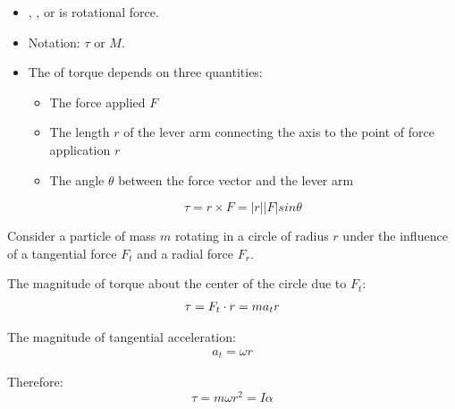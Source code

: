             \begin{itemize}
                \item {}, , or  is
                rotational force.
                \item Notation: $\tau$ or $M$.
                \item The  of torque depends on three quantities:
                    \begin{itemize}
                        \item The force applied $F$
                        \item The length $r$ of the lever arm connecting the axis to
                            the point of force application $r$
                        \item The angle $\theta$ between the force vector and the lever arm
                    \end{itemize}
                \begin{equation}
                    \tau = r \times F = |r||F|sin \theta
                \end{equation}
            \end{itemize}

            \par Consider a particle of mass $m$ rotating in a circle of radius $r$
            under the influence of a tangential force $F_{t}$ and a radial force
            $F_{r}$.
            \par The magnitude of torque about the center of the circle due to $F_{t}$:
            \begin{align*}
                \tau = F_{t} \cdot r = ma_{t}r
            \end{align*}
            \par The magnitude of tangential acceleration:
            \begin{align*}
                a_{t} = \omega r
            \end{align*}
            \par Therefore:
            \begin{equation} \label{eq:torq_n_momentOfInertia}
                \tau = m \omega r^{2} = I \alpha
            \end{equation}

